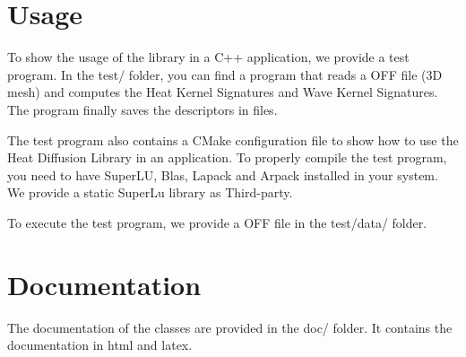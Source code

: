 \documentclass[a4paper,10pt]{article}
\begin{document}
\section{Usage}
To show the usage of the library in a C++ application, we provide a test program. In the test/ folder, you can find a program that reads a
OFF file (3D mesh) and computes the Heat Kernel Signatures and Wave Kernel Signatures. The program finally saves the descriptors in files. 

The test program also contains a CMake configuration file to show how to use the Heat Diffusion Library in an application. To properly compile
the test program, you need to have SuperLU, Blas, Lapack and Arpack installed in your system. We provide a static SuperLu library as Third-party.

To execute the test program, we provide a OFF file in the test/data/ folder.

\section{Documentation}
The documentation of the classes are provided in the doc/ folder. It contains the documentation in html and latex.
\end{document}
